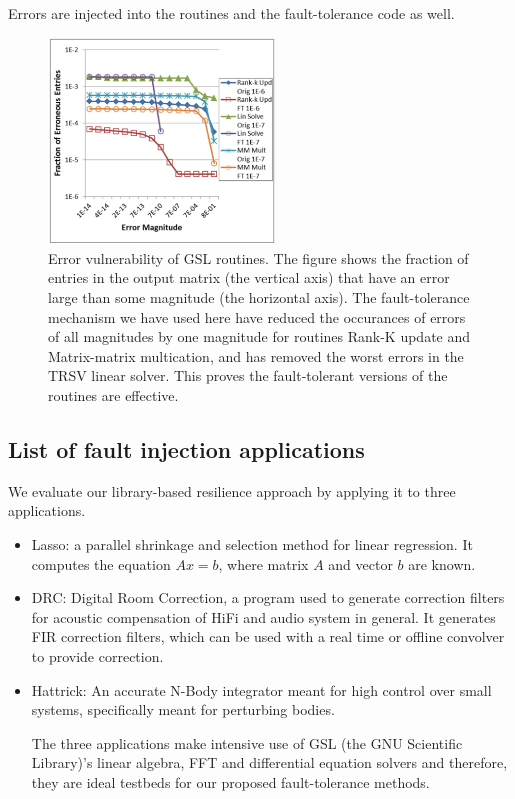 \documentclass{article}
\begin{document}
Errors are injected into the routines and the fault-tolerance code as well.

\begin{figure}
\includegraphics[width=6cm,natwidth=440,natheight=401]{vuln-gsl.png}
\caption{Error vulnerability of GSL routines. The figure shows the fraction of entries in the output matrix (the vertical axis) that have an error large than some magnitude (the horizontal axis). The fault-tolerance mechanism we have used here have reduced the occurances of errors of all magnitudes by one magnitude for routines Rank-K update and Matrix-matrix multication, and has removed the worst errors in the TRSV linear solver. This proves the fault-tolerant versions of the routines are effective.}
\label{vulnerabilityGSL}
\end{figure}

\subsection{List of fault injection applications}

We evaluate our library-based resilience approach by applying it to three applications.

\begin{itemize}
\item{Lasso: a parallel shrinkage and selection method for linear regression. It computes the equation $Ax=b$, where matrix $A$ and vector $b$ are known.}

\item{DRC: Digital Room Correction, a program used to generate correction filters for acoustic compensation of HiFi and audio system in general. It generates FIR correction filters, which can be used with a real time or offline convolver to provide correction.}

\item{Hattrick: An accurate N-Body integrator meant for high control over small systems, specifically meant for perturbing bodies.}

The three applications make intensive use of GSL (the GNU Scientific Library)'s linear algebra, FFT and differential equation solvers and therefore, they are ideal testbeds for our proposed fault-tolerance methods.

\end{itemize}
\end{document}
